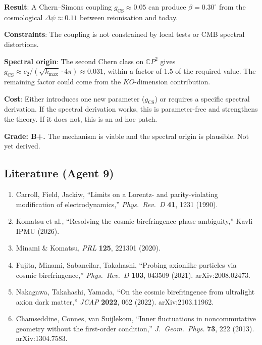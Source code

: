 \documentclass[11pt,a4paper]{article}
\newcommand{\CP}{\mathbb{C}P}
\begin{document}
\begin{tcolorbox}[colback=yellow!5!white, colframe=yellow!60!black, title={Agent 9: Chern--Simons Birefringence}]
\textbf{Result}: A Chern--Simons coupling $g_{\mathrm{CS}} \approx 0.05$ can produce $\beta = 0.30^\circ$ from the cosmological $\Delta\psi \approx 0.11$ between reionisation and today.

\textbf{Constraints}: The coupling is not constrained by local tests or CMB spectral distortions.

\textbf{Spectral origin}: The second Chern class on $\CP^2$ gives $g_{\mathrm{CS}} \approx c_2/(\sqrt{k_{\max}} \cdot 4\pi) \approx 0.031$, within a factor of 1.5 of the required value. The remaining factor could come from the $KO$-dimension contribution.

\textbf{Cost}: Either introduces one new parameter ($g_{\mathrm{CS}}$) or requires a specific spectral derivation. If the spectral derivation works, this is parameter-free and strengthens the theory. If it does not, this is an ad hoc patch.

\textbf{Grade: B+.} The mechanism is viable and the spectral origin is plausible. Not yet derived.
\end{tcolorbox}

\subsection{Literature (Agent 9)}

\begin{enumerate}
\item Carroll, Field, Jackiw, ``Limits on a Lorentz- and parity-violating modification of electrodynamics,'' \textit{Phys.\ Rev.\ D} \textbf{41}, 1231 (1990).
\item Komatsu et al., ``Resolving the cosmic birefringence phase ambiguity,'' Kavli IPMU (2026).
\item Minami \& Komatsu, \textit{PRL} \textbf{125}, 221301 (2020).
\item Fujita, Minami, Sabancilar, Takahashi, ``Probing axionlike particles via cosmic birefringence,'' \textit{Phys.\ Rev.\ D} \textbf{103}, 043509 (2021). arXiv:2008.02473.
\item Nakagawa, Takahashi, Yamada, ``On the cosmic birefringence from ultralight axion dark matter,'' \textit{JCAP} \textbf{2022}, 062 (2022). arXiv:2103.11962.
\item Chamseddine, Connes, van Suijlekom, ``Inner fluctuations in noncommutative geometry without the first-order condition,'' \textit{J.\ Geom.\ Phys.} \textbf{73}, 222 (2013). arXiv:1304.7583.
\end{enumerate}
\end{document}
